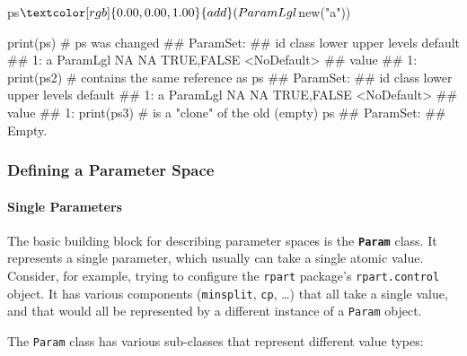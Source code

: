 \documentclass[]{article}
\newenvironment{Shaded}{}{}
\newcommand{\CommentTok}[1]{\textcolor[rgb]{0.00,0.50,0.00}{#1}}
\newcommand{\KeywordTok}[1]{\textcolor[rgb]{0.00,0.00,1.00}{#1}}
\newcommand{\NormalTok}[1]{#1}
\newcommand{\OperatorTok}[1]{#1}
\newcommand{\StringTok}[1]{\textcolor[rgb]{0.00,0.50,0.50}{#1}}
\let\oldparagraph\paragraph
\renewcommand{\paragraph}[1]{\oldparagraph{#1}\mbox{}}
\renewenvironment{Shaded} {\begin{snugshade}\small} {\end{snugshade}}
\begin{document}
\begin{Shaded}
\begin{Highlighting}[]
\NormalTok{ps}\OperatorTok{$}\KeywordTok{add}\NormalTok{(ParamLgl}\OperatorTok{$}\KeywordTok{new}\NormalTok{(}\StringTok{"a"}\NormalTok{))}
\end{Highlighting}
\end{Shaded}

\begin{Shaded}
\begin{Highlighting}[]
\KeywordTok{print}\NormalTok{(ps)  }\CommentTok{# ps was changed}
\NormalTok{## ParamSet: }
\NormalTok{##    id    class lower upper      levels     default}
\NormalTok{## 1:  a ParamLgl    NA    NA  TRUE,FALSE <NoDefault>}
\NormalTok{##    value}
\NormalTok{## 1:}
\KeywordTok{print}\NormalTok{(ps2) }\CommentTok{# contains the same reference as ps}
\NormalTok{## ParamSet: }
\NormalTok{##    id    class lower upper      levels     default}
\NormalTok{## 1:  a ParamLgl    NA    NA  TRUE,FALSE <NoDefault>}
\NormalTok{##    value}
\NormalTok{## 1:}
\KeywordTok{print}\NormalTok{(ps3) }\CommentTok{# is a "clone" of the old (empty) ps}
\NormalTok{## ParamSet: }
\NormalTok{## Empty.}
\end{Highlighting}
\end{Shaded}

\hypertarget{defining-a-parameter-space}{%
\subsubsection{Defining a Parameter Space}\label{defining-a-parameter-space}}

\hypertarget{single-parameters}{%
\paragraph{Single Parameters}\label{single-parameters}}

The basic building block for describing parameter spaces is the \textbf{\texttt{Param}} class.
It represents a single parameter, which usually can take a single atomic value.
Consider, for example, trying to configure the \texttt{rpart} package's \texttt{rpart.control} object.
It has various components (\texttt{minsplit}, \texttt{cp}, \ldots{}) that all take a single value, and that would all be represented by a different instance of a \texttt{Param} object.

The \texttt{Param} class has various sub-classes that represent different value types:
\end{document}
